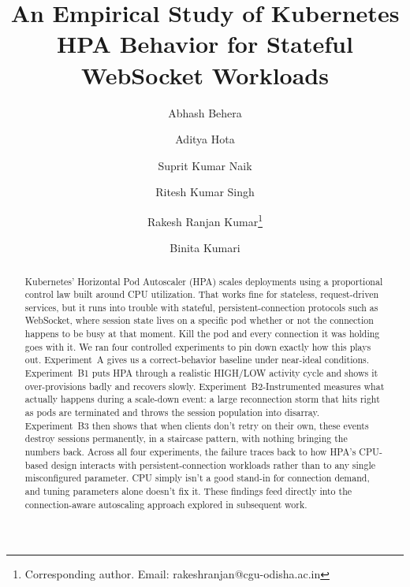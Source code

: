 \documentclass[twocolumn]{svjour3}
\begin{document}
\title{An Empirical Study of Kubernetes HPA Behavior for Stateful WebSocket Workloads}


\author{
Abhash Behera \and
Aditya Hota \and
Suprit Kumar Naik \and
Ritesh Kumar Singh \and
Rakesh Ranjan Kumar\thanks{Corresponding author. Email: rakeshranjan@cgu-odisha.ac.in} \and
Binita Kumari
}


\date{}

\maketitle

\begin{abstract}
Kubernetes' Horizontal Pod Autoscaler (HPA) scales deployments using a
proportional control law built around CPU utilization. That works fine for
stateless, request-driven services, but it runs into trouble with stateful,
persistent-connection protocols such as WebSocket, where session state lives on a
specific pod whether or not the connection happens to be busy at that moment. Kill
the pod and every connection it was holding goes with it. We ran four controlled
experiments to pin down exactly how this plays out. Experiment~A gives us a
correct-behavior baseline under near-ideal conditions. Experiment~B1 puts HPA
through a realistic HIGH/LOW activity cycle and shows it over-provisions badly and
recovers slowly. Experiment~B2-Instrumented measures what actually happens during a
scale-down event: a large reconnection storm that hits right as pods are terminated
and throws the session population into disarray. Experiment~B3 then shows that when
clients don't retry on their own, these events destroy sessions permanently, in a
staircase pattern, with nothing bringing the numbers back. Across all four
experiments, the failure traces back to how HPA's CPU-based design interacts with
persistent-connection workloads rather than to any single misconfigured parameter.
CPU simply isn't a good stand-in for connection demand, and tuning parameters alone
doesn't fix it. These findings feed directly into the connection-aware autoscaling
approach explored in subsequent work.
\end{abstract}
\end{document}

